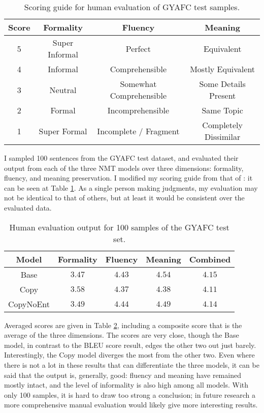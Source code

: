 \begin{table}[h]
\centering
 \begin{tabular}{|| c | c | c | c ||} 
 \hline
 Score & Formality & Fluency & Meaning \\ [0.3ex] 
 \hline\hline
 5 & Super Informal & Perfect & Equivalent \\
 \hline
 4 & Informal & Comprehensible & Mostly Equivalent \\
 \hline
 3 & Neutral & Somewhat Comprehensible & Some Details Present \\
 \hline
 2 & Formal & Incomprehensible & Same Topic \\
 \hline
 1 & Super Formal & Incomplete / Fragment & Completely Dissimilar \\
 \hline
\end{tabular}
\caption{Scoring guide for human evaluation of GYAFC test samples.}
\label{eval-score-guide}
\end{table}

I sampled 100 sentences from the GYAFC test dataset, and evaluated their output from each of the three NMT models over three dimensions: formality, fluency, and meaning preservation. I modified my scoring guide from that of \cite{rao2018gyafc}: it can be seen at Table \ref{eval-score-guide}. As a single person making judgments, my evaluation may not be identical to that of others, but at least it would be consistent over the evaluated data.

\begin{table}[h]
\centering
 \begin{tabular}{|| c | c | c | c | c ||} 
 \hline
 Model & Formality & Fluency & Meaning & Combined \\ [0.3ex] 
 \hline\hline
 Base & $3.47$ & $4.43$ & $4.54$ & $4.15$ \\
 \hline
 Copy & $3.58$ & $4.37$ & $4.38$ & $4.11$ \\
 \hline
 CopyNoEnt & $3.49$ & $4.44$ & $4.49$ & $4.14$ \\
 \hline
\end{tabular}
\caption{Human evaluation output for 100 samples of the GYAFC test set.}
\label{gyafc-human-eval}
\end{table}

Averaged scores are given in Table \ref{gyafc-human-eval}, including a composite score that is the average of the three dimensions. The scores are very close, though the Base model, in contrast to the BLEU score result, edges the other two out just barely. Interestingly, the Copy model diverges the most from the other two. Even where there is not a lot in these results that can differentiate the three models, it can be said that the output is, generally, good: fluency and meaning have remained mostly intact, and the level of informality is also high among all models. With only 100 samples, it is hard to draw too strong a conclusion; in future research a more comprehensive manual evaluation would likely give more interesting results.

